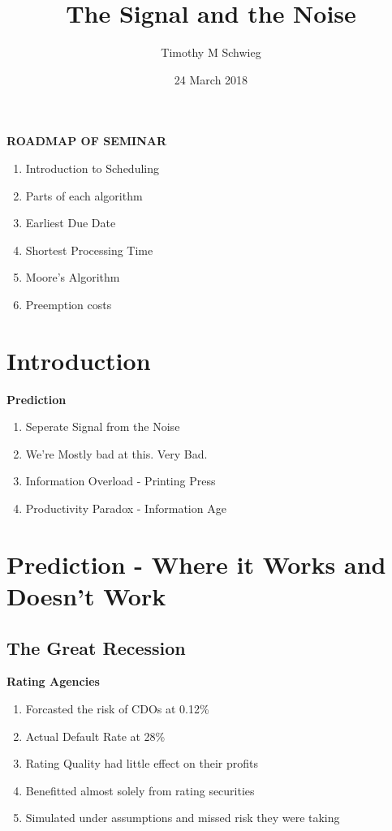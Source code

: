 \documentclass[grey,handout]{beamer}
\renewcommand{\frametitle}[1]{\begin{center}\textbf{#1}\end{center}}
\begin{document}
\title{The Signal and the Noise}

\author{Timothy M Schwieg}
\date{24 March 2018}

\begin{frame}
  \titlepage
\end{frame}

\begin{frame}
\frametitle{ROADMAP OF SEMINAR}
  \begin{enumerate}[<+->]
  \item Introduction to Scheduling
  \item Parts of each algorithm
  \item Earliest Due Date
  \item Shortest Processing Time
  \item Moore's Algorithm
  \item Preemption costs
  \end{enumerate}
\end{frame}

\section{Introduction}

\begin{frame}
  \frametitle{Prediction}
  \begin{enumerate}
  \item Seperate Signal from the Noise
  \item We're Mostly bad at this. Very Bad.
  \item Information Overload - Printing Press
  \item Productivity Paradox - Information Age
  \end{enumerate}
\end{frame}

\section{Prediction - Where it Works and Doesn't Work}


\subsection{The Great Recession}

\begin{frame}
  \frametitle{Rating Agencies}
  \begin{enumerate}
  \item Forcasted the risk of CDOs at 0.12\%
  \item Actual Default Rate at 28\%
  \item Rating Quality had little effect on their profits
  \item Benefitted almost solely from rating securities
  \item Simulated under assumptions and missed risk they were taking
  \end{enumerate}
\end{frame}
\end{document}

